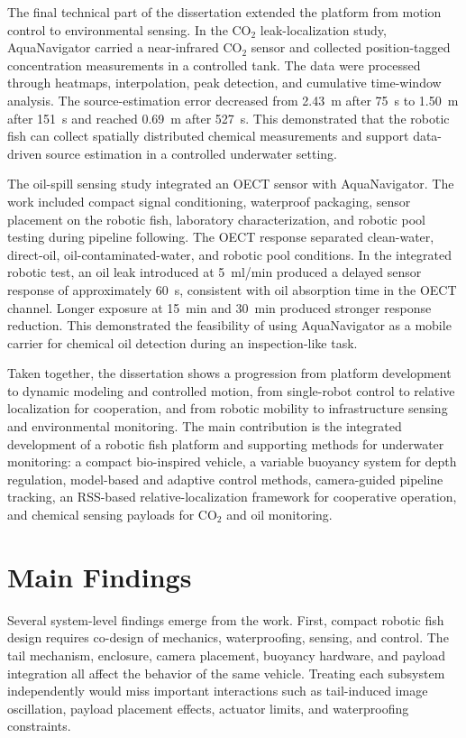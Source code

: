 \documentclass{uhcoethesis}
\begin{document}
The final technical part of the dissertation extended the platform from motion control to environmental sensing. In the \mbox{CO$_2$} leak-localization study, AquaNavigator carried a near-infrared \mbox{CO$_2$} sensor and collected position-tagged concentration measurements in a controlled tank. The data were processed through heatmaps, interpolation, peak detection, and cumulative time-window analysis. The source-estimation error decreased from 2.43~m after 75~s to 1.50~m after 151~s and reached 0.69~m after 527~s. This demonstrated that the robotic fish can collect spatially distributed chemical measurements and support data-driven source estimation in a controlled underwater setting.

The oil-spill sensing study integrated an OECT sensor with AquaNavigator. The work included compact signal conditioning, waterproof packaging, sensor placement on the robotic fish, laboratory characterization, and robotic pool testing during pipeline following. The OECT response separated clean-water, direct-oil, oil-contaminated-water, and robotic pool conditions. In the integrated robotic test, an oil leak introduced at 5~ml/min produced a delayed sensor response of approximately 60~s, consistent with oil absorption time in the OECT channel. Longer exposure at 15~min and 30~min produced stronger response reduction. This demonstrated the feasibility of using AquaNavigator as a mobile carrier for chemical oil detection during an inspection-like task.

Taken together, the dissertation shows a progression from platform development to dynamic modeling and controlled motion, from single-robot control to relative localization for cooperation, and from robotic mobility to infrastructure sensing and environmental monitoring. The main contribution is the integrated development of a robotic fish platform and supporting methods for underwater monitoring: a compact bio-inspired vehicle, a variable buoyancy system for depth regulation, model-based and adaptive control methods, camera-guided pipeline tracking, an RSS-based relative-localization framework for cooperative operation, and chemical sensing payloads for \mbox{CO$_2$} and oil monitoring.

\section{Main Findings}

Several system-level findings emerge from the work. First, compact robotic fish design requires co-design of mechanics, waterproofing, sensing, and control. The tail mechanism, enclosure, camera placement, buoyancy hardware, and payload integration all affect the behavior of the same vehicle. Treating each subsystem independently would miss important interactions such as tail-induced image oscillation, payload placement effects, actuator limits, and waterproofing constraints.
\end{document}
